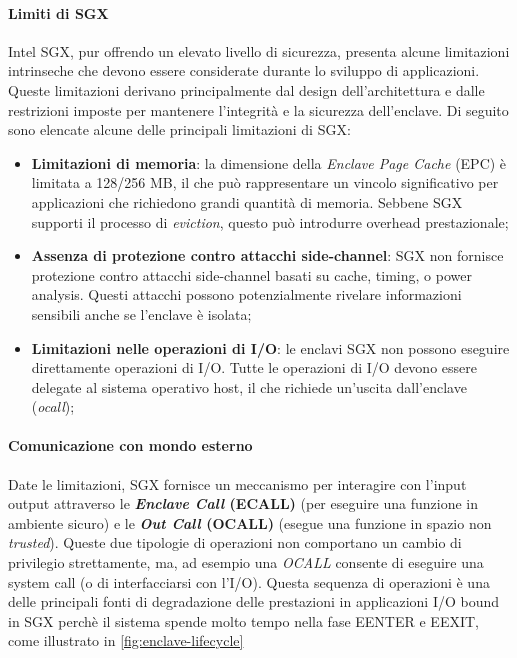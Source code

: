 \documentclass{article}
\begin{document}
\paragraph{Limiti di SGX}
Intel SGX, pur offrendo un elevato livello di sicurezza, presenta alcune limitazioni intrinseche che devono essere considerate durante lo sviluppo di applicazioni. Queste limitazioni derivano principalmente dal design dell'architettura e dalle restrizioni imposte per mantenere l'integrità e la sicurezza dell'enclave. Di seguito sono elencate alcune delle principali limitazioni di SGX:

\begin{itemize}
  \item \textbf{Limitazioni di memoria}: la dimensione della \textit{Enclave Page Cache} (EPC) è limitata a 128/256 MB, il che può rappresentare un vincolo significativo per applicazioni che richiedono grandi quantità di memoria. Sebbene SGX supporti il processo di \textit{eviction}, questo può introdurre overhead prestazionale;
  \item \textbf{Assenza di protezione contro attacchi side-channel}: SGX non fornisce protezione contro attacchi side-channel basati su cache, timing, o power analysis. Questi attacchi possono potenzialmente rivelare informazioni sensibili anche se l'enclave è isolata;
  \item \textbf{Limitazioni nelle operazioni di I/O}: le enclavi SGX non possono eseguire direttamente operazioni di I/O. Tutte le operazioni di I/O devono essere delegate al sistema operativo host, il che richiede un'uscita dall'enclave (\textit{ocall});
\end{itemize}

\paragraph{Comunicazione con mondo esterno} Date le limitazioni, SGX fornisce un meccanismo per interagire con l'input output attraverso le \textbf{\textit{Enclave Call} (ECALL)} (per eseguire una funzione in ambiente sicuro) e le \textbf{\textit{Out Call} (OCALL)} (esegue una funzione in spazio non \textit{trusted}). Queste due tipologie di operazioni non comportano un cambio di privilegio strettamente, ma, ad esempio una \textit{OCALL} consente di eseguire una system call (o di interfacciarsi con l'I/O). Questa sequenza di operazioni è una delle principali fonti di degradazione delle prestazioni in applicazioni I/O bound in SGX perchè il sistema spende molto tempo nella fase EENTER  e EEXIT, come illustrato in \cref{fig:enclave-lifecycle}
\end{document}
